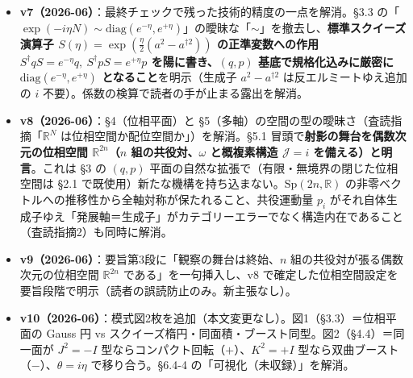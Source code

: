 \documentclass[
]{ltjsarticle}
\providecommand{\tightlist}{%
  \setlength{\itemsep}{0pt}\setlength{\parskip}{0pt}}
\begin{document}
\begin{itemize}
  \begin{itemize}
  \tightlist
  \item
    要旨第3段の「どの量を直接観測可能とし、どの量を発展生成子とするか」を
    §4.4
    と同じ「一径数部分群をコンパクト時間発展／非コンパクト発展（解析接続・ブースト）として扱うか」に統一。
  \item
    §5.1「この \(i\) が\ldots 計量符号の \(-\)
    として\textbf{現れる}」→「計量符号 \(-\)
    と\textbf{対応づけて読む}ことができる」。
  \item
    §1.2 表の床を \(\sqrt{\det\Sigma}\)（相関ゼロ枠で
    \(\Delta q\,\Delta p\)）に表記統一。
  \item
    §6.1 の「\(i\) の同定」→「同じ複素構造で記述される形式的対応」。
  \item
    §2.2 の「Gauss
    関数ただ一つ」→「平行移動・平均運動量位相・幅・全体位相を除いて
    Gauss 型に限られる（Gaussian family）」。
  \item
    §3.3「相対論的速度として読み直される」→「形式的には相対論的速度パラメータと対応づけられる」。
  \end{itemize}
\item
  \textbf{v7（2026-06）}：最終チェックで残った技術的精度の一点を解消。§3.3
  の「\(\exp(-i\eta N)\sim\mathrm{diag}(e^{-\eta},e^{+\eta})\)」の曖昧な「\(\sim\)」を撤去し、\textbf{標準スクイーズ演算子
  \(S(\eta)=\exp(\tfrac{\eta}{2}(a^2-a^{\dagger2}))\) の正準変数への作用
  \(S^\dagger q S=e^{-\eta}q,\ S^\dagger p S=e^{+\eta}p\)
  を陽に書き、\((q,p)\) 基底で規格化込みに厳密に
  \(\mathrm{diag}(e^{-\eta},e^{+\eta})\) となること}を明示（生成子
  \(a^2-a^{\dagger2}\) は反エルミートゆえ追加の \(i\)
  不要）。係数の検算で読者の手が止まる露出を解消。
\item
  \textbf{v8（2026-06）}：§4（位相平面）と
  §5（多軸）の空間の型の曖昧さ（査読指摘「\(\mathbb{R}^N\)
  は位相空間か配位空間か」）を解消。§5.1
  冒頭で\textbf{射影の舞台を偶数次元の位相空間
  \(\mathbb{R}^{2n}\)（\(n\) 組の共役対、\(\omega\) と概複素構造
  \(\mathcal{J}=i\) を備える）と明言}。これは §3 の \((q,p)\)
  平面の自然な拡張で（有限・無境界の閉じた位相空間は §2.1
  で既使用）新たな機構を持ち込まない。\(\mathrm{Sp}(2n,\mathbb{R})\)
  の非零ベクトルへの推移性から全軸対称が保たれること、共役運動量 \(p_i\)
  がそれ自体生成子ゆえ「発展軸＝生成子」がカテゴリーエラーでなく構造内在であること（査読指摘2）も同時に解消。
\item
  \textbf{v9（2026-06）}：要旨第3段に「観察の舞台は終始、\(n\)
  組の共役対が張る偶数次元の位相空間 \(\mathbb{R}^{2n}\)
  である」を一句挿入し、v8
  で確定した位相空間設定を要旨段階で明示（読者の誤読防止のみ。新主張なし）。
\item
  \textbf{v10（2026-06）}：模式図2枚を追加（本文変更なし）。図1（§3.3）＝位相平面の
  Gauss 円 vs
  スクイーズ楕円・同面積・ブースト同型。図2（§4.4）＝同一面が \(J^2=-I\)
  型ならコンパクト回転（\(+\)）、\(K^2=+I\)
  型なら双曲ブースト（\(-\)）、\(\theta=i\eta\) で移り合う。§6.4-4
  の「可視化（未収録）」を解消。
\end{itemize}
\end{document}
